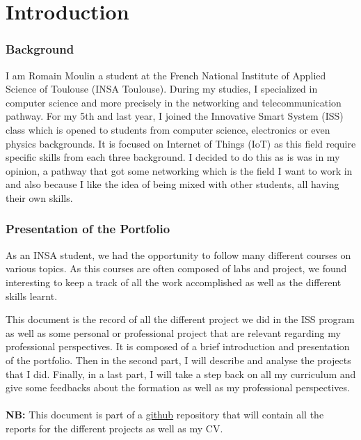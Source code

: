 \part{Introduction}

\section{Background}

I am Romain Moulin a student at the French National Institute of Applied Science of Toulouse (INSA Toulouse). During my studies, I specialized in computer science and more precisely in the networking and telecommunication pathway. For my 5th and last year, I joined the Innovative Smart System (ISS) class which is opened to students from computer science, electronics or even physics backgrounds. It is focused on Internet of Things (IoT) as this field require specific skills from each three background. I decided to do this as is was in my opinion, a pathway that got some networking which is the field I want to work in and also because I like the idea of being mixed with other students, all having their own skills.

\section{Presentation of the Portfolio}

As an INSA student, we had the opportunity to follow many different courses on various topics. As this courses are often composed of labs and project, we found interesting to keep a track of all the work accomplished as well as the different skills learnt.
\\\par 
This document is the record of all the different project we did in the ISS program as well as some personal or professional project that are relevant regarding my professional perspectives. It is composed of a brief introduction and presentation of the portfolio. Then in the second part, I will describe and analyse the projects that I did. Finally, in a last part, I will take a step back on all my curriculum and give some feedbacks about the formation as well as my professional perspectives.
\\ \\
\textbf{NB: }This document is part of a \href{https://github.com/RomainMln/Portfolio}{github} repository that will contain all the reports for the different projects as well as my CV.

